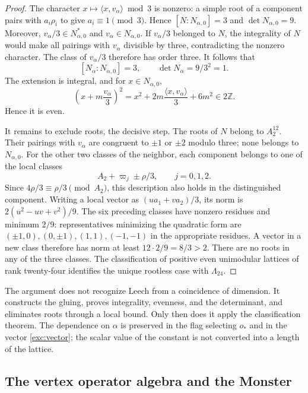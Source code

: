 \begin{proof}
The character $x\mapsto\langle x,v_\alpha\rangle\bmod3$ is nonzero:
a simple root of a component pairs with $a_i\rho_i$ to give
$a_i\equiv1\pmod3$. Hence $[N:N_{\alpha,0}]=3$ and
$\det N_{\alpha,0}=9$. Moreover,
$v_\alpha/3\in N_{\alpha,0}^*$ and $v_\alpha\in N_{\alpha,0}$.
If $v_\alpha/3$ belonged to $N$, the integrality of $N$ would make
all pairings with $v_\alpha$ divisible by three,
contradicting the nonzero character. The class of $v_\alpha/3$ therefore
has order three. It follows that
\[
 [N_\alpha:N_{\alpha,0}]=3,
 \qquad \det N_\alpha=9/3^2=1.
\]
The extension is integral, and for $x\in N_{\alpha,0}$,
\[
 \left(x+m\frac{v_\alpha}{3}\right)^2
   =x^2+2m\frac{\langle x,v_\alpha\rangle}{3}+6m^2
   \in2\mathbb Z.
\]
Hence it is even.

It remains to exclude roots, the decisive step. The roots of $N$
belong to $A_2^{12}$. Their pairings with $v_\alpha$ are
congruent to $\pm1$ or $\pm2$ modulo three; none belongs to
$N_{\alpha,0}$. For the other two classes of the neighbor, each component
belongs to one of the local classes
\[
 A_2+\varpi_j\pm\rho/3,\qquad j=0,1,2.
\]
Since $4\rho/3\equiv\rho/3\pmod{A_2}$, this description also holds
in the distinguished component. Writing a local vector
as $(u a_1+v a_2)/3$, its norm is
$2(u^2-uv+v^2)/9$. The six preceding classes have nonzero residues
and minimum $2/9$: representatives minimizing the quadratic form
are $(\pm1,0),(0,\pm1),(1,1),(-1,-1)$ in the appropriate residues.
A vector in a new class therefore has norm at least
$12\cdot2/9=8/3>2$. There are no roots in any of the three classes.
The classification of positive even unimodular lattices of
rank twenty-four identifies the unique rootless case with
$\Lambda_{24}$.
\end{proof}

The argument does not recognize Leech from a coincidence of dimension.
It constructs the gluing, proves integrality, evenness, and the determinant, and
eliminates roots through a local bound. Only then does it apply the
classification theorem. The dependence on $\alpha$ is preserved in
the flag selecting $o_*$ and in the vector \eqref{exc:vector};
the scalar value of the constant is not converted into a length of the
lattice.

\subsection{The vertex operator algebra and the Monster}
\label{exc:voa}

